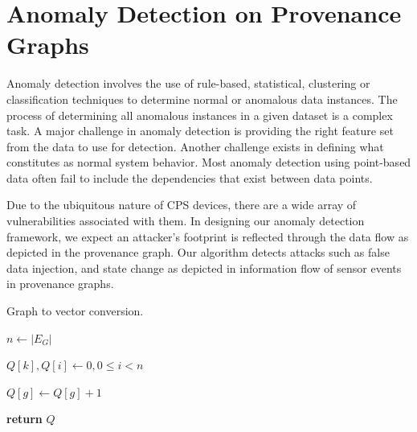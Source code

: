 \section{Anomaly Detection on Provenance Graphs}
Anomaly detection involves the use of rule-based, statistical, clustering or classification techniques to determine normal or anomalous data instances. The process of determining all anomalous instances in a given dataset is a complex task. A major challenge in anomaly detection is providing the right feature set from the data to use for detection. Another challenge exists in defining what constitutes as normal system behavior. Most anomaly detection using point-based data often fail to include the dependencies that exist between data points. 

\par Due to the ubiquitous nature of CPS devices, there are a wide array of vulnerabilities associated with them. In designing our anomaly detection framework, we expect an attacker's footprint is reflected through the data flow as depicted in the provenance graph. Our algorithm detects attacks such as false data injection, and state change as depicted in information flow of sensor events in provenance graphs.

\begin{algorithm}[h!]  
\caption{Graph to vector conversion.} 
 \label{graph_to_vector} 
\begin{algorithmic}[1]


\State $n \gets |E_G|$

\State $Q[k],Q[i] \gets 0, 0 \leq i < n$




\State $Q[g] \gets Q[g] + 1$
\EndIf

\EndFor

\EndFor


\State \textbf{return} $Q$

\EndProcedure

\end{algorithmic}
\end{algorithm}


